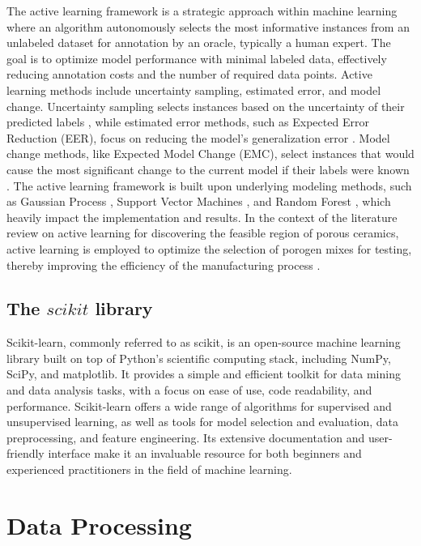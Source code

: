 \documentclass[10pt]{article}
\begin{document}
\begin{multicols}{2}
The active learning framework is a strategic approach within machine learning where an algorithm autonomously selects the most informative instances from an unlabeled dataset for annotation by an oracle, typically a human expert. The goal is to optimize model performance with minimal labeled data, effectively reducing annotation costs and the number of required data points. Active learning methods include uncertainty sampling, estimated error, and model change. Uncertainty sampling selects instances based on the uncertainty of their predicted labels \cite{lewis_sequential_1994}, while estimated error methods, such as Expected Error Reduction (EER), focus on reducing the model's generalization error \cite{roy2001toward}. Model change methods, like Expected Model Change (EMC), select instances that would cause the most significant change to the current model if their labels were known \cite{cai2014active}. The active learning framework is built upon underlying modeling methods, such as Gaussian Process \cite{rasmussen_gaussian_2005}, Support Vector Machines \cite{cortes1995support}, and Random Forest \cite{breiman2001random}, which heavily impact the implementation and results. In the context of the literature review on active learning for discovering the feasible region of porous ceramics, active learning is employed to optimize the selection of porogen mixes for testing, thereby improving the efficiency of the manufacturing process \cite{knudde_active_2019}.

\subsection{The $scikit$ library}

Scikit-learn, commonly referred to as scikit, is an open-source machine learning library built on top of Python's scientific computing stack, including NumPy, SciPy, and matplotlib. It provides a simple and efficient toolkit for data mining and data analysis tasks, with a focus on ease of use, code readability, and performance. Scikit-learn offers a wide range of algorithms for supervised and unsupervised learning, as well as tools for model selection and evaluation, data preprocessing, and feature engineering. Its extensive documentation and user-friendly interface make it an invaluable resource for both beginners and experienced practitioners in the field of machine learning.

\section{Data Processing}


\end{multicols}
\end{document}
